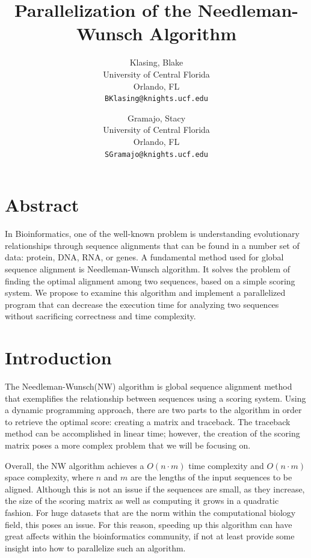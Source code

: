 \documentclass[letterpaper, 10 pt, conference]{IEEEconf}
\begin{document}
\title{\LARGE\bfseries Parallelization of the Needleman-Wunsch Algorithm}

\author{
	Klasing, Blake\\
	University of Central Florida \\
	Orlando, FL \\
	\texttt{BKlasing@knights.ucf.edu}
	\and
	Gramajo, Stacy\\
	University of Central Florida \\
	Orlando, FL \\
	\texttt{SGramajo@knights.ucf.edu} \\
	}
\maketitle
\section{Abstract}

In Bioinformatics, one of the well-known problem is understanding evolutionary relationships through sequence alignments that can be found in a number set of data: protein, DNA, RNA, or genes. A fundamental method used for global sequence alignment is Needleman-Wunsch algorithm. It solves the problem of finding the optimal alignment among two sequences, based on a simple scoring system. We propose to examine this algorithm and implement a parallelized program that can decrease the execution time for analyzing two sequences without sacrificing correctness and time complexity.


\section{Introduction}

The Needleman-Wunsch(NW) algorithm is global sequence alignment method that exemplifies the relationship between sequences using a scoring system. Using a dynamic programming approach, there are two parts to the algorithm in order to retrieve the optimal score: creating a matrix and traceback. The traceback method can be accomplished in linear time; however, the creation of the scoring matrix poses a more complex problem that we will be focusing on. 

Overall, the NW algorithm achieves a $O(n\cdot m)$ time complexity and $O(n\cdot m)$ space complexity, where $n$ and $m$ are the lengths of the input sequences to be aligned. Although this is not an issue if the sequences are small, as they increase, the size of the scoring matrix as well as computing it grows in a quadratic fashion. For huge datasets that are the norm within the computational biology field, this poses an issue. For this reason, speeding up this algorithm can have great affects within the bioinformatics community, if not at least provide some insight into how to parallelize such an algorithm. 
\end{document}
